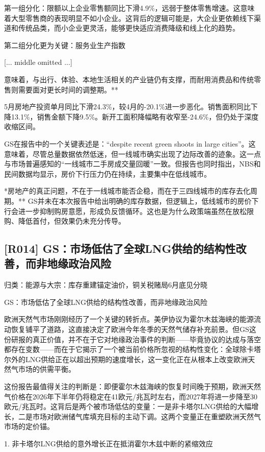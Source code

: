\documentclass[11pt]{ctexart}
\begin{document}
第一组分化：限额以上企业零售额同比下滑4.9\%，远弱于整体零售增速。这意味着大型零售商的表现明显不如小企业。这背后的逻辑可能是，大企业更依赖线下渠道和传统品类，而小企业更灵活，能够更快适应消费降级和线上化的趋势。

第二组分化更为关键：服务业生产指数

[... middle omitted ...]

意味着，与出行、体验、本地生活相关的产业链仍有支撑，而耐用消费品和传统零售则需要面对更长时间的调整期。**

5月房地产投资单月同比下滑24.3\%，较4月的-20.1\%进一步恶化。销售面积同比下降13.1\%，销售金额下降9.5\%。新开工面积降幅略有收窄至-24.6\%，但仍处于深度收缩区间。

GS在报告中的一个关键表述是：“despite recent green shoots in large cities”。这意味着，尽管总量数据依然低迷，但一线城市确实出现了边际改善的迹象。这一点与市场普遍感知的“一线城市二手房成交量回暖”一致。但报告也同时指出，NBS和民间数据均显示，房价下行压力仍在持续，主要集中在低线城市。

*房地产的真正问题，不在于一线城市能否企稳，而在于三四线城市的库存去化周期。** GS并未在本次报告中给出明确的库存数据，但逻辑上，低线城市的房价下行会进一步抑制购房意愿，形成负反馈循环。这也是为什么政策端虽然在放松限购、降低首付，但效果仍未充分传导。

\subsection{[R014] GS：市场低估了全球LNG供给的结构性改善，而非地缘政治风险}
{\small\color{refgray}归类：能源与大宗：库存重建锚定油价，铜关税赌局6月底见分晓}

GS：市场低估了全球LNG供给的结构性改善，而非地缘政治风险

欧洲天然气市场刚刚经历了一个关键的转折点。美伊协议为霍尔木兹海峡的能源流动恢复铺平了道路，这直接决定了欧洲今年冬季的天然气储存补充前景。但GS这份研报的真正价值，并不在于它对地缘政治事件的判断——毕竟协议的达成与落空都存在变数——而在于它揭示了一个被当前价格所忽视的结构性变化：全球除卡塔尔外的LNG供给正在以超出预期的速度增长，这一变化正在从根本上改变欧洲天然气市场的供需平衡。

这份报告最值得关注的判断是：即便霍尔木兹海峡的恢复时间晚于预期，欧洲天然气价格在2026年下半年仍将稳定在41欧元/兆瓦时左右，而2027年将进一步降至30欧元/兆瓦时。这背后是两个被市场低估的变量：一是非卡塔尔LNG供给的大幅增长，二是市场对欧洲储气库填充目标的主动下调。这两个变量正在重塑欧洲天然气市场的定价锚。

1. 非卡塔尔LNG供给的意外增长正在抵消霍尔木兹中断的紧缩效应
\end{document}
